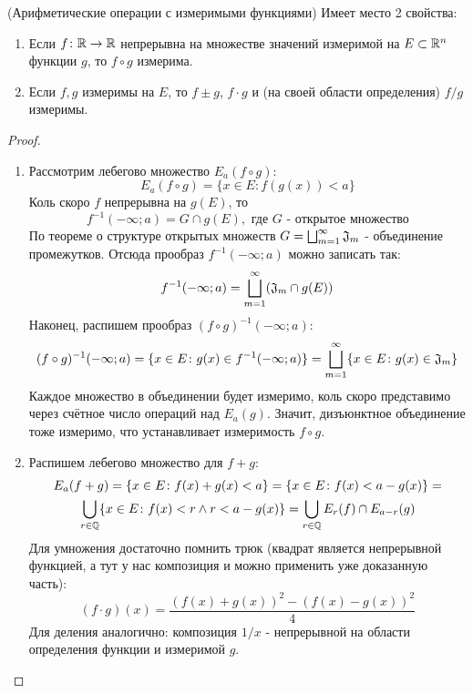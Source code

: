 \begin{theorem} (Арифметические операции с измеримыми функциями) \label{arithmMF}
	Имеет место 2 свойства:
	\begin{enumerate}
		\item Если $f \colon \mathbb{R} \to \mathbb{R}$ непрерывна на множестве значений измеримой на $E \subset \mathbb{R}^n$ функции $g$, то $f \circ g$ измерима.
		
		\item Если $f, g$ измеримы на $E$, то $f \pm g$, $f \cdot g$ и (на своей области определения) $f / g$ измеримы.
	\end{enumerate}
\end{theorem}

\begin{proof}~
	\begin{enumerate}
		\item Рассмотрим лебегово множество $E_a(f \circ g)$:
		\[
			E_a(f \circ g) = \{x \in E \colon f(g(x)) < a\}
		\]
		Коль скоро $f$ непрерывна на $g(E)$, то
		\[
			f^{-1}(-\infty; a) = G \cap g(E), \text{ где $G$ - открытое множество}
		\]
		По теореме о структуре открытых множеств $G = \bigsqcup_{m = 1}^\infty \mathfrak{J}_m$ - объединение промежутков. Отсюда прообраз $f^{-1}(-\infty; a)$ можно записать так:
		\[
			f^{-1}(-\infty; a) = \bigsqcup_{m = 1}^\infty (\mathfrak{J}_m \cap g(E))
		\]
		Наконец, распишем прообраз $(f \circ g)^{-1}(-\infty; a)$:
		\[
			(f \circ g)^{-1}(-\infty; a) = \{x \in E \colon g(x) \in f^{-1}(-\infty; a)\} = \bigsqcup_{m = 1}^\infty \{x \in E \colon g(x) \in \mathfrak{J}_m\}
		\]
		Каждое множество в объединении будет измеримо, коль скоро представимо через счётное число операций над $E_a(g)$. Значит, дизъюнктное объединение тоже измеримо, что устанавливает измеримость $f \circ g$.
		
		\item Распишем лебегово множество для $f + g$:
		\begin{multline*}
			E_a(f + g) = \{x \in E \colon f(x) + g(x) < a\} = \{x \in E \colon f(x) < a - g(x)\} =
			\\
			\bigcup_{r \in \mathbb{Q}} \{x \in E \colon f(x) < r \wedge r < a - g(x)\} = \bigcup_{r \in \mathbb{Q}} E_r(f) \cap E_{a - r}(g)
		\end{multline*}
		Для умножения достаточно помнить трюк (квадрат является непрерывной функцией, а тут у нас композиция и можно применить уже доказанную часть):
		\[
			(f \cdot g)(x) = \frac{(f(x) + g(x))^2 - (f(x) - g(x))^2}{4}
		\]
		Для деления аналогично: композиция $1 / x$ - непрерывной на области определения функции и измеримой $g$.
	\end{enumerate}
\end{proof}


